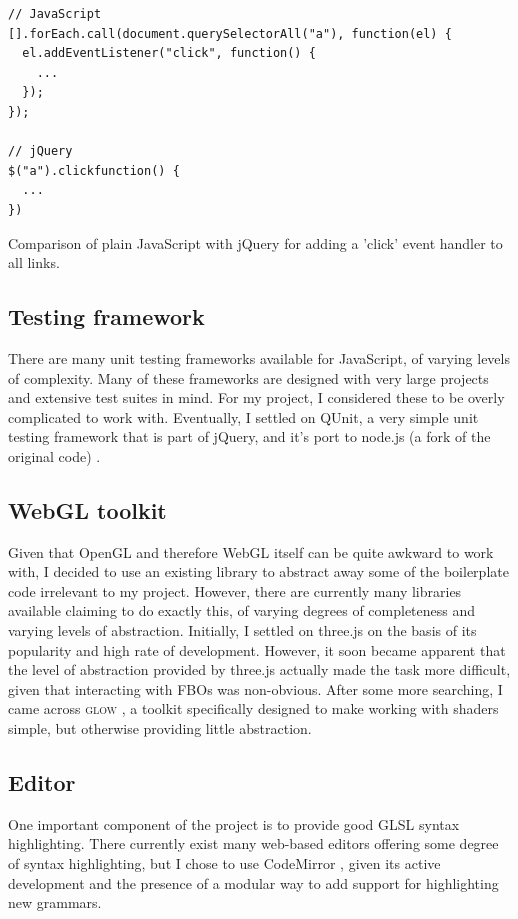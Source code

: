 \documentclass[12pt,twoside,notitlepage]{report}
\begin{document}
\begin{listing}[H]
\begin{verbatim}
// JavaScript
[].forEach.call(document.querySelectorAll("a"), function(el) {
  el.addEventListener("click", function() {
    ...
  });
});

// jQuery
$("a").clickfunction() {
  ...
})

\end{verbatim}
\caption{Comparison of plain JavaScript with jQuery for adding a 'click' event handler to all links.\label{jq}}
\end{listing}

\subsection*{Testing framework}
There are many unit testing frameworks available for JavaScript, of varying levels of complexity. Many of these frameworks are designed with very large projects and extensive test suites in mind. For my project, I considered these to be overly complicated to work with. Eventually, I settled on QUnit\citep{qunit}, a very simple unit testing framework that is part of jQuery, and it's port to node.js (a fork of the original code) \citep{qunit-node}.

\subsection*{WebGL toolkit}
Given that OpenGL and therefore WebGL itself can be quite awkward to work with, I decided to use an existing library to abstract away some of the boilerplate code irrelevant to my project. However, there are currently many libraries available claiming to do exactly this, of varying degrees of completeness and varying levels of abstraction. Initially, I settled on three.js \citep{three} on the basis of its popularity and high rate of development. However, it soon became apparent that the level of abstraction provided by three.js actually made the task more difficult, given that interacting with FBOs was non-obvious. After some more searching, I came across \textsc{glow} \citep{glow}, a toolkit specifically designed to make working with shaders simple, but otherwise providing little abstraction.

\subsection*{Editor}
\label{cmirror}
One important component of the project is to provide good GLSL syntax highlighting. There currently exist many web-based editors offering some degree of syntax highlighting, but I chose to use CodeMirror \citep{codemirror}, given its active development and the presence of a modular way to add support for highlighting new grammars. 
\end{document}
